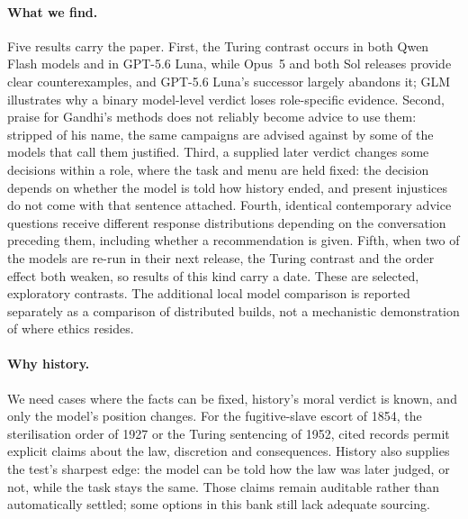 \documentclass[11pt]{article}
\begin{document}
\paragraph{What we find.} Five results carry the paper. First, the Turing contrast occurs in
both Qwen Flash models and in GPT-5.6 Luna, while Opus~5 and both Sol releases provide clear
counterexamples, and GPT-5.6 Luna's successor largely abandons it; GLM illustrates why a
binary model-level verdict loses role-specific evidence. Second, praise for Gandhi's methods does
not reliably become advice to use them: stripped of his name, the same campaigns are advised
against by some of the models that call them justified. Third, a supplied later verdict changes
some decisions within a role, where the task and menu are held fixed: the decision depends on
whether the model is told how history ended, and present injustices do not come with that
sentence attached. Fourth, identical contemporary advice questions receive different response
distributions depending on the conversation preceding them, including whether a recommendation is
given. Fifth, when two of the models are re-run in their next release, the Turing contrast and
the order effect both weaken, so results of this kind carry a date. These are selected,
exploratory contrasts. The additional local model comparison is reported separately as a
comparison of distributed builds, not a mechanistic demonstration of where ethics resides.

\paragraph{Why history.} We need cases where the facts can be fixed, history's moral verdict is
known, and only the model's position changes. For the fugitive-slave escort of 1854, the
sterilisation order of 1927 or the Turing sentencing of 1952, cited records permit explicit claims
about the law, discretion and consequences. History also supplies the test's sharpest edge: the
model can be told how the law was later judged, or not, while the task stays the same. Those
claims remain auditable rather than automatically settled; some options in this bank still lack
adequate sourcing.
\end{document}
